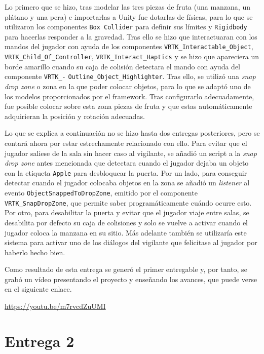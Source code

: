 Lo primero que se hizo, tras modelar las tres piezas de fruta (una manzana, un plátano y una pera) e importarlas a Unity fue dotarlas de físicas, para lo que se utilizaron los componentes \texttt{Box Collider} para definir sus límites y \texttt{Rigidbody} para hacerlas responder a la gravedad. Tras ello se hizo que interactuaran con los mandos del jugador con ayuda de los componentes \texttt{VRTK\_Interactable\_Object}, \texttt{VRTK\_Child\_Of\_Controller}, \texttt{VRTK\_Interact\_Haptics} y se hizo que apareciera un borde amarillo cuando su caja de colisión detectara el mando con ayuda del componente \texttt{VRTK\_-} \texttt{Outline\_Object\_Highlighter}. Tras ello, se utilizó una \textit{snap drop zone} o zona en la que poder colocar objetos, para lo que se adaptó uno de los modelos proporcionados por el framework. Tras configurarlo adecuadamente, fue posible colocar sobre esta zona piezas de fruta y que estas automáticamente adquirieran la posición y rotación adecuadas.

Lo que se explica a continuación no se hizo hasta dos entregas posteriores, pero se contará ahora por estar estrechamente relacionado con ello. Para evitar que el jugador saliese de la sala sin hacer caso al vigilante, se añadió un script a la \textit{snap drop zone} antes mencionada que detectara cuando el jugador dejaba un objeto con la etiqueta \texttt{Apple} para desbloquear la puerta. Por un lado, para conseguir detectar cuando el jugador colocaba objetos en la zona se añadió un \textit{listener} al evento \texttt{ObjectSnappedToDropZone}, emitido por el componente \texttt{VRTK\_SnapDropZone}, que permite saber programáticamente cuándo ocurre esto. Por otro, para desabilitar la puerta y evitar que el jugador viaje entre salas, se desabilita por defecto su caja de colisiones y solo se vuelve a activar cuando el jugador coloca la manzana en su sitio. Más adelante también se utilizaría este sistema para activar uno de los diálogos del vigilante que felicitase al jugador por haberlo hecho bien.

Como resultado de esta entrega se generó el primer entregable y, por tanto, se grabó un vídeo presentando el proyecto y enseñando los avances, que puede verse en el siguiente enlace.

\begin{center}
    \url{https://youtu.be/m7rvcdZuUMI}
\end{center}



\section{Entrega 2}

